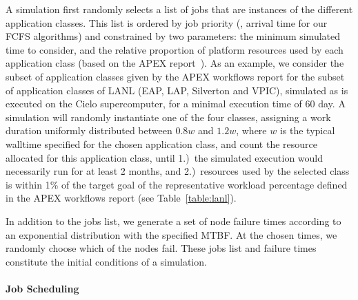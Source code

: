 A simulation first randomly selects a list of jobs that are instances
of the different application classes. This list is ordered by job
priority (\ie, arrival time for our FCFS algorithms) and constrained
by two parameters: the minimum simulated time to consider, and the
relative proportion of platform resources used by each application
class (based on the APEX report~\cite{apex2016}).  As an example, we
consider the subset of application classes given by the APEX workflows
report for the subset of application classes of LANL (EAP, LAP,
Silverton and VPIC), simulated as is executed on the Cielo
supercomputer, for a minimal execution time of 60 day. A simulation
will randomly instantiate one of the four classes, assigning a work
duration uniformly distributed between $0.8w$ and $1.2w$, where $w$ is
the typical walltime specified for the chosen application class, and
count the resource allocated for this application class, until 1.)~the
simulated execution would necessarily run for at least 2 months, and
2.)~resources used by the selected class is within 1\% of the target
goal of the representative workload percentage defined in the APEX
workflows report (see Table~\ref{table:lanl}).

In addition to the jobs list, we generate a set of node failure times according to an
exponential distribution with the specified MTBF. At the chosen times, we randomly
choose which of the nodes fail.  These jobs list and failure times constitute
the initial conditions of a simulation.

\paragraph*{Job Scheduling}

